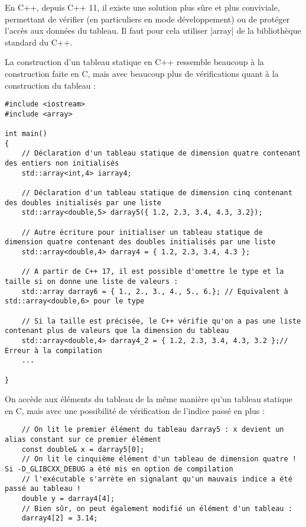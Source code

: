 En C++, depuis C++ 11, il existe une solution plus sûre et plus conviviale, permettant de vérifier (en particuliers en mode développement) ou de protéger l'accès aux données du tableau. Il faut pour cela utiliser |array| de la bibliothèque standard du C++.

La construction d'un tableau statique en C++ ressemble beaucoup à la construction faite en C, mais avec beaucoup plus de vérifications quant à la construction du tableau :

\begin{lstlisting}
#include <iostream>
#include <array> 

int main()
{
    // Déclaration d'un tableau statique de dimension quatre contenant des entiers non initialisés
    std::array<int,4> iarray4;

    // Déclaration d'un tableau statique de dimension cinq contenant des doubles initialisés par une liste
    std::array<double,5> darray5({ 1.2, 2.3, 3.4, 4.3, 3.2});

    // Autre écriture pour initialiser un tableau statique de dimension quatre contenant des doubles initialisés par une liste
    std::array<double,4> darray4 = { 1.2, 2.3, 3.4, 4.3 };

    // A partir de C++ 17, il est possible d'omettre le type et la taille si on donne une liste de valeurs :
    std::array darray6 = { 1., 2., 3., 4., 5., 6.}; // Equivalent à std::array<double,6> pour le type

    // Si la taille est précisée, le C++ vérifie qu'on a pas une liste contenant plus de valeurs que la dimension du tableau
    std::array<double,4> darray4_2 = { 1.2, 2.3, 3.4, 4.3, 3.2 };// Erreur à la compilation 
    ...

}
\end{lstlisting}

On accède aux éléments du tableau de la même manière qu'un tableau statique en C, mais avec une possibilité de vérification de l'indice passé en plus :

\begin{lstlisting}
    // On lit le premier élément du tableau darray5 : x devient un alias constant sur ce premier élément
    const double& x = darray5[0];
    // On lit le cinquième élément d'un tableau de dimension quatre ! Si -D_GLIBCXX_DEBUG a été mis en option de compilation
    // l'exécutable s'arrète en signalant qu'un mauvais indice a été passé au tableau !
    double y = darray4[4];
    // Bien sûr, on peut également modifié un élément d'un tableau :
    darray4[2] = 3.14;
\end{lstlisting}

